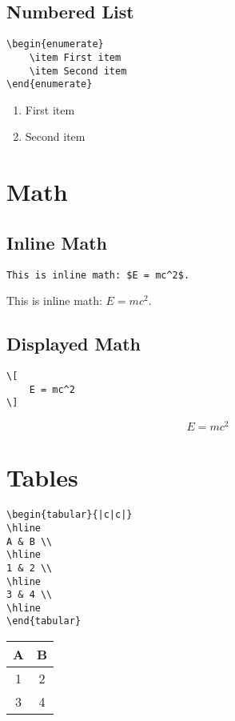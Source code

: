 \documentclass[a4paper,10pt]{article}
\begin{document}
\subsection{Numbered List}
\begin{verbatim}
\begin{enumerate}
    \item First item
    \item Second item
\end{enumerate}
\end{verbatim}
\begin{enumerate}
    \item First item
    \item Second item
\end{enumerate}

\section{Math}
\subsection{Inline Math}
\begin{verbatim}
This is inline math: $E = mc^2$.
\end{verbatim}
This is inline math: $E = mc^2$.

\subsection{Displayed Math}
\begin{verbatim}
\[
    E = mc^2
\]
\end{verbatim}
\[
    E = mc^2
\]

\section{Tables}
\begin{verbatim}
\begin{tabular}{|c|c|}
\hline
A & B \\
\hline
1 & 2 \\
\hline
3 & 4 \\
\hline
\end{tabular}
\end{verbatim}

\begin{center}
\begin{tabular}{|c|c|}
\hline
A & B \\
\hline
1 & 2 \\
\hline
3 & 4 \\
\hline
\end{tabular}
\end{center}
\end{document}
